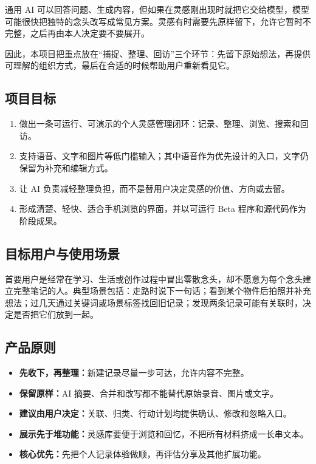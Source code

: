 \documentclass[UTF8,a4paper,12pt]{ctexart}
\begin{document}
通用 AI 可以回答问题、生成内容，但如果在灵感刚出现时就把它交给模型，模型可能很快把独特的念头改写成常见方案。灵感有时需要先原样留下，允许它暂时不完整，之后再由本人决定要不要展开。

因此，本项目把重点放在“捕捉、整理、回访”三个环节：先留下原始想法，再提供可理解的组织方式，最后在合适的时候帮助用户重新看见它。

\subsection{项目目标}
\begin{enumerate}
  \item 做出一条可运行、可演示的个人灵感管理闭环：记录、整理、浏览、搜索和回访。
  \item 支持语音、文字和图片等低门槛输入；其中语音作为优先设计的入口，文字仍保留为补充和编辑方式。
  \item 让 AI 负责减轻整理负担，而不是替用户决定灵感的价值、方向或去留。
  \item 形成清楚、轻快、适合手机浏览的界面，并以可运行 Beta 程序和源代码作为阶段成果。
\end{enumerate}

\subsection{目标用户与使用场景}
首要用户是经常在学习、生活或创作过程中冒出零散念头，却不愿意为每个念头建立完整笔记的人。典型场景包括：走路时说下一句话；看到某个物件后拍照并补充想法；过几天通过关键词或场景标签找回旧记录；发现两条记录可能有关联时，决定是否把它们放到一起。

\subsection{产品原则}
\begin{itemize}
  \item \textbf{先收下，再整理：}新建记录尽量一步可达，允许内容不完整。
  \item \textbf{保留原样：}AI 摘要、合并和改写都不能替代原始录音、图片或文字。
  \item \textbf{建议由用户决定：}关联、归类、行动计划均提供确认、修改和忽略入口。
  \item \textbf{展示先于堆功能：}灵感库要便于浏览和回忆，不把所有材料挤成一长串文本。
  \item \textbf{核心优先：}先把个人记录体验做顺，再评估分享及其他扩展功能。
\end{itemize}
\end{document}
